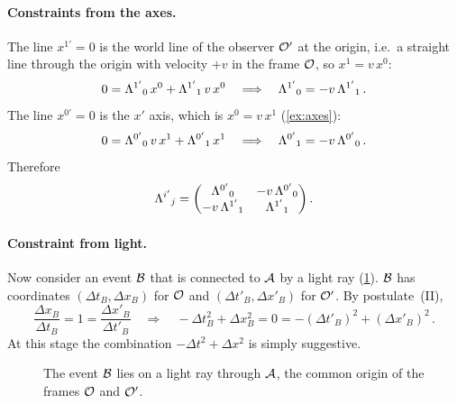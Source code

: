 \paragraph{Constraints from the axes.}
The line $x^{1'} = 0$ is the world line of the observer $\mathcal{O}'$ at the origin, i.e.\ a straight
line through the origin with velocity $+v$ in the frame $\mathcal{O}$, so $x^1 = v\,x^0$:
\begin{equation}
    0 = \Lambda^{1'}{}_{0}\, x^0 + \Lambda^{1'}{}_{1}\, v\, x^0
    \quad\Longrightarrow\quad
    \Lambda^{1'}{}_{0} = -v\, \Lambda^{1'}{}_{1} \, .
\end{equation}
The line $x^{0'} = 0$ is the $x'$ axis, which is $x^0 = v\,x^1$ (\cref{ex:axes}):
\begin{equation}
    0 = \Lambda^{0'}{}_{0}\, v\, x^1 + \Lambda^{0'}{}_{1}\, x^1
    \quad\Longrightarrow\quad
    \Lambda^{0'}{}_{1} = -v\, \Lambda^{0'}{}_{0} \, .
\end{equation}
Therefore
\begin{equation}
    \Lambda^{i'}{}_{j} =
    \begin{pmatrix} \Lambda^{0'}{}_{0} & -v\,\Lambda^{0'}{}_{0} \\ -v\,\Lambda^{1'}{}_{1} & \Lambda^{1'}{}_{1} \end{pmatrix} .
    \label{eq:lambda_two_unknowns}
\end{equation}

\paragraph{Constraint from light.}
Now consider an event $\mathcal{B}$ that is connected to $\mathcal{A}$ by a light ray
(\cref{fig:light_event}). $\mathcal{B}$ has coordinates $(\Delta t_B, \Delta x_B)$ for $\mathcal{O}$ and
$(\Delta t'_B, \Delta x'_B)$ for $\mathcal{O}'$. By postulate~(II),
\begin{equation}
    \frac{\Delta x_B}{\Delta t_B} = 1 = \frac{\Delta x'_B}{\Delta t'_B}
    \quad\Longrightarrow\quad
    -\Delta t_B^2 + \Delta x_B^2 = 0 = -(\Delta t'_B)^2 + (\Delta x'_B)^2 \, .
    \label{eq:null_interval}
\end{equation}
At this stage the combination $-\Delta t^2 + \Delta x^2$ is simply suggestive.

\begin{figure}[H]
    \centering
    \caption{The event $\mathcal{B}$ lies on a light ray through $\mathcal{A}$, the common origin of the
        frames $\mathcal{O}$ and $\mathcal{O}'$.}
    \label{fig:light_event}
\end{figure}

